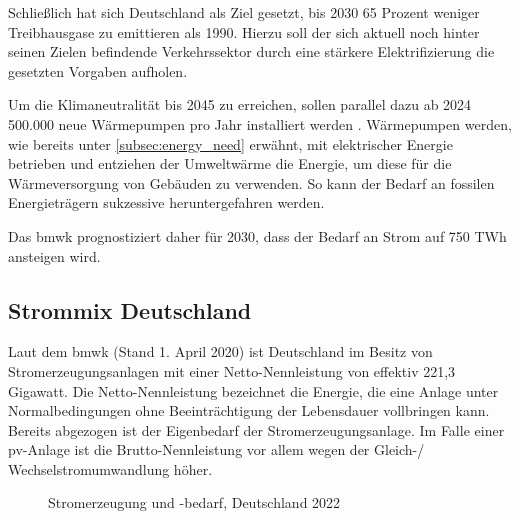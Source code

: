 \documentclass[12pt, a4paper]{article}
\begin{document}
Schließlich hat sich Deutschland als Ziel gesetzt, bis 2030 65 Prozent weniger Treibhausgase zu emittieren als 1990. Hierzu soll der sich aktuell noch hinter seinen Zielen befindende Verkehrssektor durch eine stärkere Elektrifizierung die gesetzten Vorgaben aufholen.

Um die Klimaneutralität bis 2045 zu erreichen, sollen parallel dazu ab 2024 500.000 neue Wärmepumpen pro Jahr installiert werden \cite{ws:bundesregierung}. Wärmepumpen werden, wie bereits unter \autoref{subsec:energy_need} erwähnt, mit elektrischer Energie betrieben und entziehen der Umweltwärme die Energie, um diese für die Wärmeversorgung von Gebäuden zu verwenden. So kann der Bedarf an fossilen Energieträgern sukzessive heruntergefahren werden.

Das \ac{bmwk} prognostiziert daher für 2030, dass der Bedarf an Strom auf 750 TWh ansteigen wird.

\subsection{Strommix Deutschland}

Laut dem \ac{bmwk} (Stand 1. April 2020) ist Deutschland im Besitz von Stromerzeugungsanlagen mit einer Netto-Nennleistung von effektiv 221,3 Gigawatt. Die Netto-Nennleistung bezeichnet die Energie, die eine Anlage unter Normalbedingungen ohne Beeinträchtigung der Lebensdauer vollbringen kann. Bereits abgezogen ist der Eigenbedarf der Stromerzeugungsanlage. Im Falle einer \ac{pv}-Anlage ist die Brutto-Nennleistung vor allem wegen der Gleich-/ Wechselstromumwandlung höher. 

\begin{figure}
\centering
\def\svgwidth{450pt}
\fontsize{7}{10}\selectfont

\caption{Stromerzeugung und -bedarf, Deutschland 2022}
\label{fig:stromerzeugung_de_2022}
\end {figure}
\end{document}
